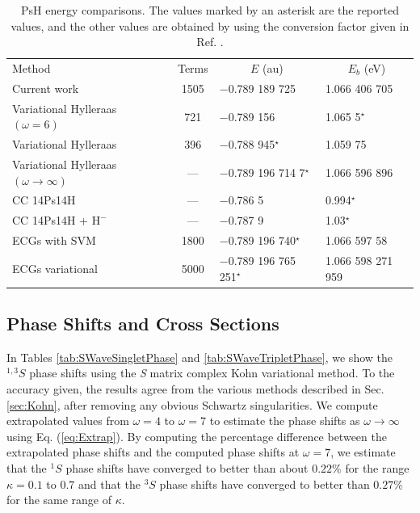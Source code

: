 \documentclass[preprint,showpacs,showkeys,preprintnumbers,amsmath,amssymb,longbibliography,pra,aps]{revtex4-1}
\newcommand*{\thead}[1]{\multicolumn{1}{c}{#1}}
\begin{document}
\squeezetable  %
\begin{table}
\begin{center}
\begin{ruledtabular}  %
\begin{tabular}{l c l l}
Method & Terms & \thead{$E$ (au)} & \thead{$E_b$ (eV)}\\
\colrule
Current work & 1505 & $-$0.789 189 725 & 1.066 406 705 \\
Variational Hylleraas $(\omega = 6)$ \cite{VanReeth2003} & 721 & $-$0.789 156 & 1.065 5$^\star$ \\
Variational Hylleraas \cite{Ho1986} & 396 & $-$0.788 945$^\star$ & 1.059 75 \\
Variational Hylleraas $(\omega \rightarrow \infty)$ \cite{Yan1999} & --- & $-$0.789 196 714 7$^\star$ & 1.066 596 896 \\
CC 14Ps14H \cite{Blackwood2002} & --- & $-$0.786 5 & 0.994$^\star$ \\
CC 14Ps14H + $\text{H}^-$ \cite{Walters2004} & --- & $-$0.787 9 & 1.03$^\star$\\
ECGs with SVM \cite{Mitroy2006} & 1800 & $-$0.789 196 740$^\star$ & 1.066 597 58 \\
ECGs variational \cite{Bubin2006} & 5000 & $-$0.789 196 765 251$^\star$ & 1.066 598 271 959 \\
\end{tabular}
\end{ruledtabular}
\caption{PsH energy comparisons. The values marked by an asterisk are the
reported values, and the other values are obtained by using the conversion
factor given in Ref. \cite{Mohr2012,*NISTConversions}.}
\label{tab:BoundEnergy}
\end{center}
\end{table}

\subsection{Phase Shifts and Cross Sections}

In Tables \ref{tab:SWaveSingletPhase} and \ref{tab:SWaveTripletPhase}, we 
show the $^{1,3}S$ phase shifts using the \emph{S} matrix complex Kohn 
variational method. To the accuracy given, the results agree from the various 
methods described in Sec. \ref{sec:Kohn}, after removing any obvious Schwartz 
singularities. We compute extrapolated values from $\omega = 4$ to
$\omega = 7$
to estimate the phase shifts as $\omega \rightarrow \infty$ using Eq.
(\ref{eq:Extrap}). By computing the percentage difference between the extrapolated 
phase shifts and the computed phase shifts at $\omega=7$, we estimate that 
the $^1S$ phase shifts have converged to better than about $0.22\%$ for the 
range $\kappa=0.1$ to $0.7$ and that the $^3S$ phase shifts have converged to 
better than $0.27\%$ for the same range of $\kappa$.
\end{document}
